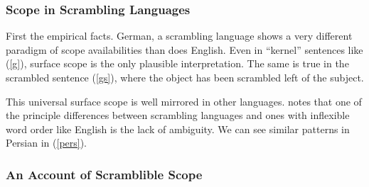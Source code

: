 \documentclass{article}
\begin{document}
\subsubsection{Scope in Scrambling Languages}

First the empirical facts.
German, a scrambling language shows a very different paradigm of scope availabilities than does English.
Even in ``kernel'' sentences like (\ref{g}), surface scope is the only plausible interpretation.
The same is true in the scrambled sentence (\ref{gs}), where the object has been scrambled left of the subject.

\begin{exe}
\end{exe}

This universal surface scope is well mirrored in other languages.
\textcite{karimi03} notes that one of the principle differences between scrambling languages and ones with inflexible word order like English is the lack of ambiguity.
We can see similar patterns in Persian in (\ref{pers}).

\begin{exe}
\ex\label{pers} \begin{xlist}
\end{xlist}\end{exe}


\subsubsection{An Account of Scramblible Scope}
\end{document}
